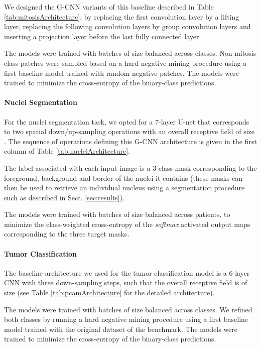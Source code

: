 \documentclass[twocolumn,final]{article}
\begin{document}
We designed the G-CNN variants of this baseline described in Table \ref{tab:mitosisArchitecture}, by replacing the first convolution layer by a lifting layer, replacing the following convolution layers by group convolution layers and inserting a projection layer before the last fully connected layer.

The models were trained with batches of size  balanced across classes. Non-mitosis class patches were sampled based on a hard negative mining procedure \citep{cirecsan2013mitosis} using a first baseline model trained with random negative patches.
The models were trained to minimize the cross-entropy of the binary-class predictions.


\paragraph{Nuclei Segmentation}
For the nuclei segmentation task, we opted for a 7-layer U-net that corresponds to two spatial down/up-sampling operations with an overall receptive field of size .
The sequence of operations defining this G-CNN architecture is given in the first column of Table \ref{tab:nucleiArchitecture}.

The label associated with each input image is a 3-class mask corresponding to the foreground, background and border of the nuclei it contains (these masks can then be used to retrieve an individual nucleus using a segmentation procedure such as described in Sect. \ref{sec:results}).

The models were trained with batches of size  balanced across patients, to minimize the class-weighted cross-entropy of the \textit{softmax} activated output maps corresponding to the three target masks.

\paragraph{Tumor Classification}
The baseline architecture we used for the tumor classification model is a 6-layer CNN with three down-sampling steps, such that the overall receptive field is of size  (see Table \ref{tab:pcamArchitecture} for the detailed architecture).

The models were trained with batches of size  balanced across classes.
We refined both classes by running a hard negative mining procedure \citep{cirecsan2013mitosis} using a first baseline model trained with the original dataset of the benchmark.
The models were trained to minimize the cross-entropy of the binary-class predictions.
\end{document}
